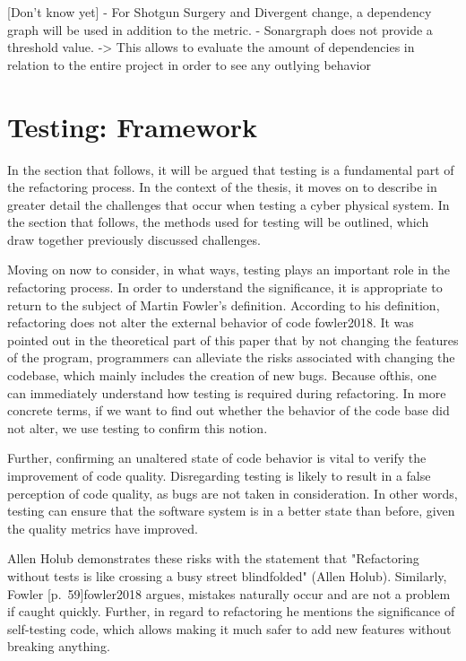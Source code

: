 [Don't know yet]
- For Shotgun Surgery and Divergent change, a dependency graph will be used in addition to the metric.
- Sonargraph does not provide a threshold value.
	-> This allows to evaluate the amount of dependencies in relation to the entire project in order to see any outlying behavior


\section{Testing: Framework}
In the section that follows, it will be argued that testing is a fundamental part of the refactoring process. In the context of the thesis, it moves on to describe in greater detail the challenges that occur when testing a cyber physical system. In the section that follows, the methods used for testing 
will be outlined, which draw together previously discussed challenges.


Moving on now to consider, in what ways, testing plays an important role in the refactoring process. In order to understand the significance, it is appropriate to return to the subject of Martin Fowler's definition. According to his definition, refactoring does not alter the external behavior of code {fowler2018}. It was pointed out in the theoretical part of this paper that by not changing the features of the program, programmers can alleviate the risks associated with changing the codebase, which mainly includes the creation of new bugs. Because ofthis, one can immediately understand how testing is required during refactoring. In more concrete terms, if we want to find out whether the behavior of the code base did not alter, we use testing to confirm this notion. 

Further, confirming an unaltered state of code behavior is vital to verify the improvement of code quality. Disregarding testing is likely to result in a false perception of code quality, as bugs are not taken in consideration. In other words, testing can ensure that the software system is in a better state than before, given the quality metrics have improved.

Allen Holub demonstrates these risks with the statement that "Refactoring without tests is like crossing a busy street blindfolded" (Allen Holub). Similarly, Fowler [p.~59]{fowler2018} argues, mistakes naturally occur and are not a problem if caught quickly. Further, in regard to refactoring he mentions the significance of self-testing code, which allows making it much safer to add new features without breaking anything.

